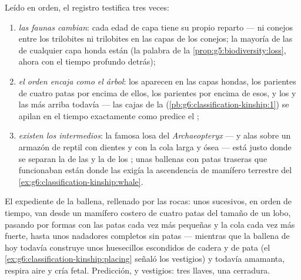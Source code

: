 \begin{proposition}\label{prop:g9:evidence-of-evolution:record}
Leído en orden, el registro testifica tres veces:
\begin{enumerate}
  \item \emph{las faunas cambian}: cada edad de capa tiene su propio
        reparto --- ni conejos entre los trilobites ni trilobites en
        las capas de los conejos; la mayoría de las  de
        cualquier capa honda están \emph{} (la palabra de la
        \cref{prop:g5:biodiversity:loss}, ahora con el tiempo profundo
        detrás);
  \item \emph{el orden encaja como el árbol}: los  aparecen en las
        capas hondas, los parientes  de cuatro patas por encima
        de ellos, los parientes  por encima de esos, y los
         y las  más arriba todavía --- las cajas de la
         (\cref{pb:g6:classification-kinship:1}) se apilan
        en el tiempo exactamente como predice el ;
  \item \emph{existen los intermedios}: la famosa losa del
        \emph{Archaeopteryx} ---  y alas sobre un armazón de
        reptil con dientes y con la cola larga y ósea --- está justo
        donde se separan la  de las  y la de los ; unas
        ballenas  con patas traseras que funcionaban están donde
        las exigía la ascendencia de mamífero terrestre del
        \cref{ex:g6:classification-kinship:whale}.
\end{enumerate}
\end{proposition}
\admitted

\begin{example}\label{ex:g9:evidence-of-evolution:whales}
El expediente de la ballena, rellenado por las rocas: unos 
sucesivos, en orden de tiempo, van desde un mamífero costero de cuatro
patas del tamaño de un lobo, pasando por formas con las patas cada vez
más pequeñas y la cola cada vez más fuerte, hasta unos nadadores
completos sin patas --- mientras que la ballena de hoy todavía
construye unos huesecillos escondidos de cadera y de pata
(el \cref{ex:g6:classification-kinship:placing} señaló los vestigios) y
todavía amamanta, respira aire y cría  fetal. Predicción,  y
vestigios: tres llaves, una cerradura.
\end{example}

